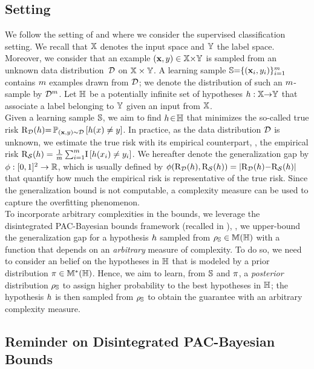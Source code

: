 \subsection{Setting}
\label{chap:dis-mu:sec:notations}

We follow the setting of  and  where we consider the supervised classification setting.
We recall that $\X$ denotes the input space and $\Y$ the label space.
Moreover, we consider that an example $(\x, \y)\in \X{\times}\Y$ is sampled from an unknown data distribution~$\D$ on $\X\times\Y$.
A learning sample $\S{=}\{(\x_i, \y_i)\}_{i=1}^\m$ contains $\m$ examples drawn \iid from $\D$; we denote the distribution of such an $\m$-sample by $\D^\m$.
Let $\H$ be a potentially infinite set of hypotheses $\h:\X{\to}\Y$ that associate a label belonging to $\Y$ given an input from $\X$.\\

Given a learning sample $\S$, we aim to find $\h \!\in\! \H$ that minimizes the so-called true risk $\Risk_{\D}(\h) {=} \PP_{(\x,\y)\sim\D}\LB h(x)\ne y\RB$.
In practice, as the data distribution $\D$ is unknown, we estimate the true risk with its empirical counterpart, \ie, the empirical risk $\Risk_{\dS}(\h) = \frac{1}{m}\sum_{i=1}^{m}\!\indic\LB h(x_i)\ne y_i\RB$.
We hereafter denote the generalization gap by $\phi: [0,1]^2\to\Rbb$, which is usually defined by $\phi(\Risk_{\D}(\h), \Risk_{\dS}(\h))=\vert\Risk_{\D}(\h){-}\Risk_{\dS}(\h)\vert$ that quantify how much the empirical risk is representative of the true risk.
Since the generalization bound is not computable, a complexity measure can be used to capture the overfitting phenomenon.\\

To incorporate arbitrary complexities in the bounds, we leverage the disintegrated PAC-Bayesian bounds framework (recalled in ), \ie, we upper-bound the generalization gap for a hypothesis $\h$ sampled from $\AQ\in\M(\H)$ with a function that depends on an \textit{arbitrary} measure of complexity.
To do so, we need to consider an \apriori belief on the hypotheses in $\H$ that is modeled by a prior distribution $\P \in \M^{*}(\H)$.
Hence, we aim to learn, from $\S$ and $\P$, a {\it posterior} distribution $\AQ$ to assign higher probability to the best hypotheses in $\H$; the hypothesis $\h$ is then sampled from $\AQ$ to obtain the guarantee with an arbitrary complexity measure. 

\subsection{Reminder on Disintegrated PAC-Bayesian Bounds}
\label{chap:dis-mu:sec:disintegrated}

